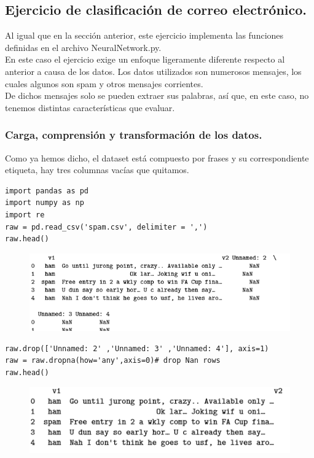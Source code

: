\documentclass[a4paper,10pt]{article}
\begin{document}
\subsection{Ejercicio de clasificación de correo electrónico.}
Al igual que en la sección anterior, este ejercicio implementa las funciones definidas en el archivo NeuralNetwork.py.\\ En este caso el ejercicio exige un enfoque ligeramente diferente respecto al anterior a causa de los datos. Los datos utilizados son numerosos mensajes, los cuales algunos son spam y otros mensajes corrientes. \\De dichos mensajes solo se pueden extraer sus palabras, así que, en este caso, no tenemos distintas características que evaluar.


\subsubsection{Carga, comprensión y transformación de los datos.}
Como ya hemos dicho, el dataset está compuesto por frases y su correspondiente etiqueta, hay tres columnas vacías que quitamos.
\begin{lstlisting}
import pandas as pd
import numpy as np
import re
raw = pd.read_csv('spam.csv', delimiter = ',')
raw.head()
\end{lstlisting}
\begin{figure}[H]
\centering
\includegraphics[scale=0.9]{Annotation 2020-03-23 174228.png}
\end{figure}
\begin{lstlisting}
raw.drop(['Unnamed: 2' ,'Unnamed: 3' ,'Unnamed: 4'], axis=1)
raw = raw.dropna(how='any',axis=0)# drop Nan rows
raw.head()
\end{lstlisting}
\begin{figure}[H]
\centering
\includegraphics{Annotation 2020-03-23 174341.png}
\end{figure}
\end{document}
